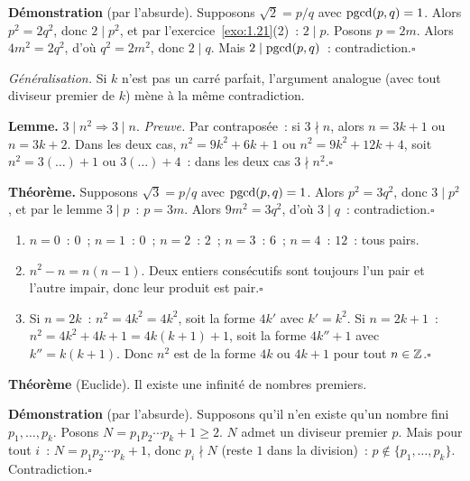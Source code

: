 \textbf{D\'emonstration} (par l'absurde). Supposons $\sqrt{2}=p/q$ avec $\operatorname{pgcd}(p,q)=1$.
Alors $p^2=2q^2$, donc $2\mid p^2$, et par l'exercice~\ref{exo:1.21}(2)~: $2\mid p$.
Posons $p=2m$. Alors $4m^2=2q^2$, d'o\`u $q^2=2m^2$, donc $2\mid q$.
Mais $2\mid\operatorname{pgcd}(p,q)$~: contradiction.\hfill$\square$

\textit{G\'en\'eralisation.} Si $k$ n'est pas un carr\'e parfait,
l'argument analogue (avec tout diviseur premier de $k$) m\`ene \`a la m\^eme contradiction.


\textbf{Lemme.} $3\mid n^2\Rightarrow3\mid n$.
\emph{Preuve.} Par contrapos\'ee~: si $3\nmid n$, alors $n=3k+1$ ou $n=3k+2$.
Dans les deux cas, $n^2=9k^2+6k+1$ ou $n^2=9k^2+12k+4$, soit $n^2=3(\ldots)+1$ ou $3(\ldots)+4$~:
dans les deux cas $3\nmid n^2$.\hfill$\square$

\textbf{Th\'eor\`eme.} Supposons $\sqrt{3}=p/q$ avec $\operatorname{pgcd}(p,q)=1$.
Alors $p^2=3q^2$, donc $3\mid p^2$, et par le lemme $3\mid p$~: $p=3m$.
Alors $9m^2=3q^2$, d'o\`u $3\mid q$~: contradiction.\hfill$\square$


\begin{enumerate}
  \item $n=0$~: $0$~; $n=1$~: $0$~; $n=2$~: $2$~; $n=3$~: $6$~; $n=4$~: $12$~: tous pairs.\checkmark
  \item $n^2-n=n(n-1)$. Deux entiers cons\'ecutifs sont toujours l'un pair et l'autre impair,
        donc leur produit est pair.\hfill$\square$
  \item Si $n=2k$~: $n^2=4k^2=4k^2$, soit la forme $4k'$ avec $k'=k^2$.
        Si $n=2k+1$~: $n^2=4k^2+4k+1=4k(k+1)+1$, soit la forme $4k''+1$ avec $k''=k(k+1)$.
        Donc $n^2$ est de la forme $4k$ ou $4k+1$ pour tout $n\in\mathbb{Z}$.\hfill$\square$
\end{enumerate}


\textbf{Th\'eor\`eme} (Euclide). Il existe une infinit\'e de nombres premiers.

\textbf{D\'emonstration} (par l'absurde). Supposons qu'il n'en existe qu'un nombre fini
$p_1,\ldots,p_k$. Posons $N=p_1p_2\cdots p_k+1\geq2$.
$N$ admet un diviseur premier $p$. Mais pour tout $i$~:
$N = p_1p_2\cdots p_k+1$, donc $p_i\nmid N$ (reste $1$ dans la division)~: $p\notin\{p_1,\ldots,p_k\}$.
Contradiction.\hfill$\square$

